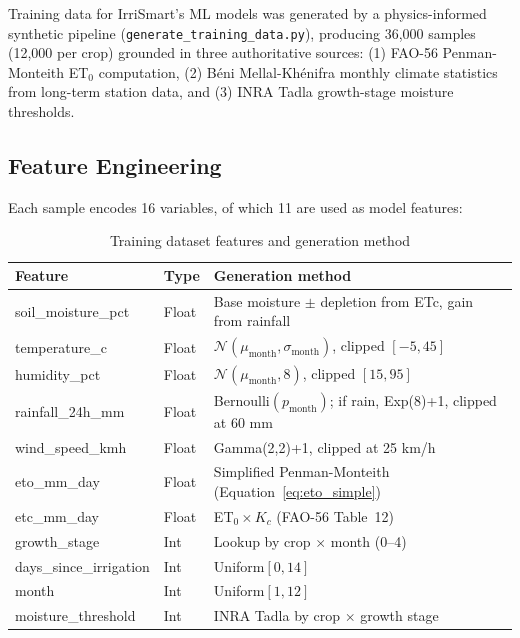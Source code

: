 \documentclass[12pt,a4paper]{report}
\begin{document}
Training data for IrriSmart's ML models was generated by a physics-informed synthetic pipeline (\texttt{generate\_training\_data.py}), producing 36,000 samples (12,000 per crop) grounded in three authoritative sources: (1) FAO-56 Penman-Monteith ET$_0$ computation, (2) Béni Mellal-Khénifra monthly climate statistics from long-term station data, and (3) INRA Tadla growth-stage moisture thresholds.

\subsection{Feature Engineering}

Each sample encodes 16 variables, of which 11 are used as model features:

\begin{table}[H]
\centering
\caption{Training dataset features and generation method}
\label{tab:features}
\begin{tabularx}{\textwidth}{llX}
\toprule
\textbf{Feature} & \textbf{Type} & \textbf{Generation method} \\
\midrule
soil\_moisture\_pct    & Float & Base moisture $\pm$ depletion from ETc, gain from rainfall \\
temperature\_c         & Float & $\mathcal{N}(\mu_{\text{month}}, \sigma_{\text{month}})$, clipped $[-5, 45]$ \\
humidity\_pct          & Float & $\mathcal{N}(\mu_{\text{month}}, 8)$, clipped $[15, 95]$ \\
rainfall\_24h\_mm      & Float & Bernoulli$(p_{\text{month}})$; if rain, Exp(8)+1, clipped at 60 mm \\
wind\_speed\_kmh        & Float & Gamma(2,2)+1, clipped at 25 km/h \\
eto\_mm\_day           & Float & Simplified Penman-Monteith (Equation~\ref{eq:eto_simple}) \\
etc\_mm\_day           & Float & ET$_0 \times K_c$ (FAO-56 Table~12) \\
growth\_stage          & Int   & Lookup by crop $\times$ month (0--4) \\
days\_since\_irrigation & Int  & Uniform$[0, 14]$ \\
month                  & Int   & Uniform$[1, 12]$ \\
moisture\_threshold    & Int   & INRA Tadla by crop $\times$ growth stage \\
\bottomrule
\end{tabularx}
\end{table}
\end{document}
